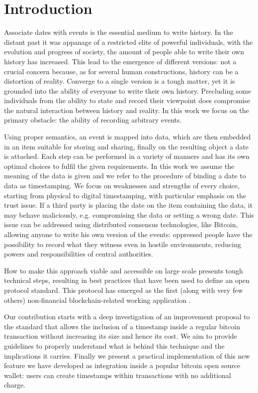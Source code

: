 \chapter{Introduction}
\label{chpr:intro}
Associate dates with events is the essential medium to write history. 
In the distant past it was appanage of a restricted elite of powerful individuals, with the evolution and progress of society, the amount of people able to write their own history has increased.
This lead to the emergence of different versions: not a crucial concern because, as for several human constructions, history can be a distortion of reality.
Converge to a single version is a tough matter, yet it is grounded into the ability of everyone to write their own history.
Precluding some individuals from the ability to state and record their viewpoint does compromise the natural interaction between history and reality.
In this work we focus on the primary obstacle: the ability of recording arbitrary events.

Using proper semantics, an event is mapped into data, which are then embedded in an item suitable for storing and sharing, finally on the resulting object a date is attached. 
Each step can be performed in a variety of manners and has its own optimal choices to fulfil the given requirements. 
In this work we assume the meaning of the data is given and we refer to the procedure of binding a date to data as timestamping. 
We focus on weaknesses and strengths of every choice, starting from physical to digital timestamping, with particular emphasis on the trust issue.
If a third party is placing the date on the item containing the data, it may behave maliciously, e.g. compromising the data or setting a wrong date. This issue can be addressed using distributed consensus technologies, like Bitcoin, allowing anyone to write his own version of the events: oppressed people have the possibility to record what they witness even in hostile environments, reducing powers and responsibilities of central authorities.

How to make this approach viable and accessible on large scale presents tough technical steps, resulting in best practices \cite{OTSWeb} that have been used to define an open protocol standard. This protocol has emerged as the first (along with very few others) non-financial blockchain-related working application \cite{ESMAresponse}.

Our contribution starts with a deep investigation of an improvement proposal \cite{PoePR, PoeIs} to the standard that allows the inclusion of a timestamp inside a regular bitcoin transaction without increasing its size and hence its cost. 
We aim to provide guidelines to properly understand what is behind this technique and the implications it carries.
Finally we present a practical implementation of this new feature we have developed as integration inside a popular bitcoin open source wallet: users can create timestamps within transactions with no additional charge. 

